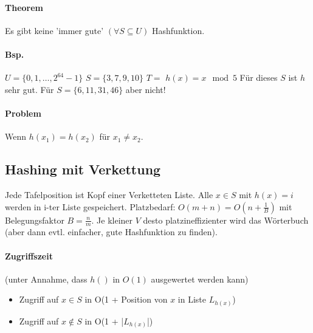 \paragraph*{Theorem} Es gibt keine 'immer gute' $(\forall S \subseteq U)$ Hashfunktion.

\paragraph*{Bsp.} $U=\{ 0,1,\dots,2^{64}-1 \}$ $S=\{ 3,7,9,10 \}$ $T=$ %
$h(x) = x \mod 5$ Für dieses $S$ ist $h$ sehr gut. Für $S=\{ 6,11,31,46 \}$ aber nicht!

\paragraph*{Problem} Wenn $h(x_1)=h(x_2)$ für $x_1 \not= x_2$.


\subsection{Hashing mit Verkettung}
Jede Tafelposition ist Kopf einer Verketteten Liste. Alle $x \in S$ mit $h(x)=i$ werden in i-ter Liste gespeichert. Platzbedarf: $O(m+n) = O(n+\frac{1}{B})$ mit Belegungsfaktor $B=\frac{n}{m}$. %
Je kleiner $V$ desto platzineffizienter wird das Wörterbuch (aber dann evtl. einfacher, gute Hashfunktion zu finden).

\paragraph*{Zugriffszeit} (unter Annahme, dass $h()$ in $O(1)$ ausgewertet werden kann)
\begin{itemize}
	\item[] Zugriff auf $x \in S$ in O(1 + Position von $x$ in Liste $L_{h(x)}$)
	\item[] Zugriff auf $x \not\in S$ in O(1 + |$L_{h(x)}$|)
\end{itemize}

